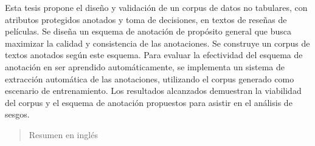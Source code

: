 \begin{resumen}
	Esta tesis propone el dise\~no y validaci\'on de un corpus de datos no tabulares, con atributos protegidos anotados y toma de 
	decisiones, en textos de rese\~nas de pel\'iculas. Se dise\~na un esquema de anotaci\'on de prop\'osito general que busca maximizar 
	la calidad y consistencia de las anotaciones. Se construye un corpus de textos anotados seg\'un este esquema. Para evaluar la 
	efectividad del esquema de anotaci\'on en ser aprendido autom\'aticamente, se implementa un sistema de extracci\'on autom\'atica de 
	las anotaciones, utilizando el corpus generado como escenario de entrenamiento. Los resultados alcanzados demuestran la viabilidad 
	del corpus y el esquema de anotaci\'on propuestos para asistir en el an\'alisis de sesgos.



\end{resumen}

\begin{abstract}
	Resumen en inglés
\end{abstract}